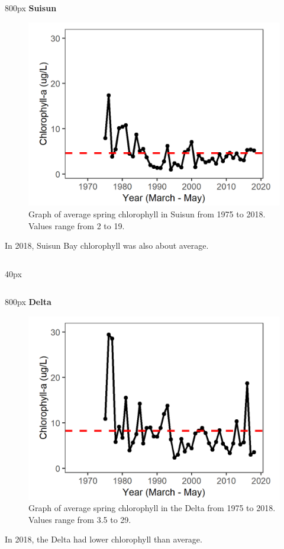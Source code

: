 \documentclass[
]{book}
\begin{document}
\begin{column}{800px\textwidth}
\textbf{Suisun}

\begin{figure}
\includegraphics[width=15.25in]{figures/chla_ssspring} \caption{Graph of average spring chlorophyll in Suisun from 1975 to 2018. Values range from 2 to 19.}\label{fig:unnamed-chunk-21}
\end{figure}

In 2018, Suisun Bay chlorophyll was also about average.
\end{column}

\begin{column}{40px\textwidth}
~
\end{column}

\begin{column}{800px\textwidth}
\textbf{Delta}

\begin{figure}
\includegraphics[width=15.25in]{figures/chla_dtspring} \caption{Graph of average spring chlorophyll in the Delta from 1975 to 2018. Values range from 3.5 to 29.}\label{fig:unnamed-chunk-22}
\end{figure}

In 2018, the Delta had lower chlorophyll than average.
\end{column}
\end{document}
